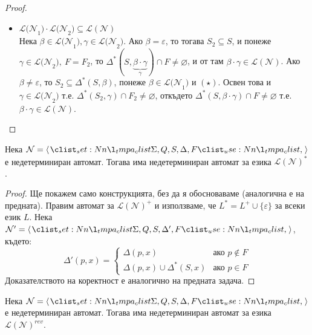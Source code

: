 \begin{proof}
\begin{itemize}
        \item $\mathcal{L(N}_1) \cdot \mathcal{L(N}_2) \subseteq \mathcal{L(N)}$ \\
              Нека $\beta \in \mathcal{L(N}_1), \gamma \in \mathcal{L(N}_2)$.
              Ако $\beta = \varepsilon$, то тогава $S_2 \subseteq S$, и понеже $\gamma \in \mathcal{L(N}_2), \: F = F_2$,
              то $\Delta^*(S, \underbrace{\beta \cdot \gamma}_{\gamma}) \cap F \neq \varnothing$, и от там $\beta \cdot \gamma \in \mathcal{L(N)}$.
              Ако $\beta \neq \varepsilon$, то $S_2 \subseteq \Delta^*(S, \beta)$, понеже $\beta \in \mathcal{L(N}_1)$ и $(\star)$.
              Освен това и $\gamma \in \mathcal{L(N}_2)$ т.е. $\Delta^*(S_2, \gamma) \cap F_2 \neq \varnothing$,
              откъдето $\Delta^*(S, \beta \cdot \gamma) \cap F \neq \varnothing$ т.е. $\beta \cdot \gamma \in \mathcal{L(N)}$.
    \end{itemize}
\end{proof}

\begin{claim}
    Нека $\mathcal{N} = \opair{\Sigma, Q, S, \Delta, F}$ е недетерминиран автомат.
    Тогава има недетерминиран автомат за езика $\mathcal{L(N)^*}$.
\end{claim}

\begin{proof}
    Ще покажем само конструкцията, без да я обосноваваме (аналогична е на предната).
    Правим автомат за $\mathcal{L(N)^+}$ и използваме, че $L^* = L^+ \cup \{ \varepsilon \}$ за всеки език $L$.
    Нека $\mathcal{N}' = \opair{\Sigma, Q, S, \Delta', F}$, където:
    \begin{equation}
        \Delta'(p, x) =
        \begin{cases}
            \Delta(p, x)                     & \text{ако } p \notin F \\
            \Delta(p, x) \cup \Delta^*(S, x) & \text{ако } p \in F
        \end{cases}
    \end{equation}
    Доказателството на коректност е аналогично на предната задача.
\end{proof}

\begin{claim}
    Нека $\mathcal{N} = \opair{\Sigma, Q, S, \Delta, F}$ е недетерминиран автомат.
    Тогава има недетерминиран автомат за езика $\mathcal{L(N)}^{rev}$.
\end{claim}

